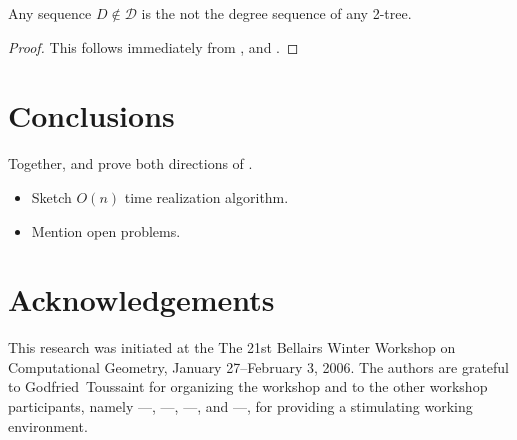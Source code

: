 \documentclass[lotsofwhite,charterfonts]{patmorin}
\begin{document}
\begin{lem}
Any sequence $D\not\in \mathcal{D}$ is the not the degree sequence of
any 2-tree.
\end{lem}

\begin{proof}
This follows immediately from ,  and
.
\end{proof}

\section{Conclusions}

Together,  and  prove both directions of
.

\begin{itemize}
\item Sketch $O(n)$ time realization algorithm.
\item Mention open problems.
\end{itemize}

\section{Acknowledgements}

This research was initiated at the The 21st Bellairs Winter Workshop
on Computational Geometry, January 27--February 3, 2006.  The authors
are grateful to Godfried~Toussaint for organizing the workshop and to
the other workshop participants, namely
---,
---,
---, and
---,
for providing a stimulating working environment.




\end{document}

